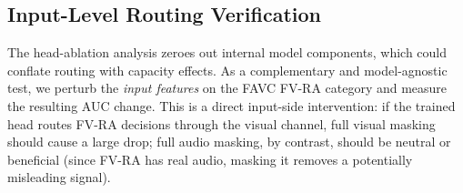 \documentclass{article}
\newcommand{\method}{\textsc{TriRoute}}
\begin{document}


\subsection{Input-Level Routing Verification}
\label{sec:input_masking}
The head-ablation analysis zeroes out internal model components, which could conflate routing with capacity effects. As a complementary and model-agnostic test, we perturb the \emph{input features} on the FAVC FV-RA category and measure the resulting AUC change. This is a direct input-side intervention: if the trained head routes FV-RA decisions through the visual channel, full visual masking should cause a large drop; full audio masking, by contrast, should be neutral or beneficial (since FV-RA has real audio, masking it removes a potentially misleading signal).
\end{document}
